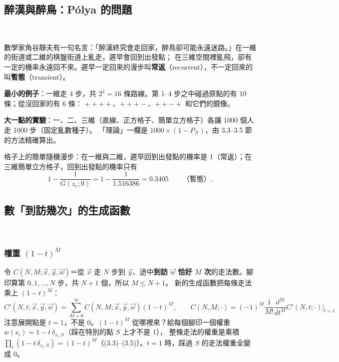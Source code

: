 \subsection{醉漢與醉鳥：Pólya 的問題}
\ 

數學家角谷靜夫有一句名言：「醉漢終究會走回家，醉鳥卻可能永遠迷路。」在一維的街道或二維的棋盤街道上亂走，遲早會回到出發點；
在三維空間裡亂飛，卻有一定的機率永遠回不來。遲早一定回來的漫步叫\textbf{常返}（recurrent），不一定回來的叫\textbf{暫態}（transient）。

\textbf{最小的例子}：一維走 4 步，共 $2^4=16$ 條路線。第 1--4 步之中碰過原點的有 10 條；從沒回家的有 6 條：
$++++$、$+++-$、$++-+$ 和它們的鏡像。

\textbf{大一點的實驗}：一、二、三維（直線、正方格子、簡單立方格子）各讓 1000 個人走 1000 步（固定亂數種子）。
「理論」一欄是 $1000\times(1-P_N)$，由 3.3--3.5 節的方法精確算出。
\begin{table}[H]
\centering
\small
\ThreeTabSim
\caption{各 1000 人的模擬：回過家的人數。一、二維的比例一直往 1 爬（二維爬得很慢），三維卡在三分之一左右}\label{three-tab-sim}
\end{table}

\begin{thmbox}[Pólya 定理]
格子上的簡單隨機漫步：在一維與二維，遲早回到出發點的機率是 1（常返）；在三維簡單立方格子，回到出發點的機率只有
\[1-\frac{1}{G(z_c;0)}=1-\frac{1}{1.516386}=0.3405\qquad\text{（暫態）}.\]
\end{thmbox}

\subsection{數「到訪幾次」的生成函數}
\ 

\subsubsection{權重 \texorpdfstring{$(1-t)^M$}{(1-t) 的 M 次方}}
令 $C(N,M;\vec x,\vec y,\vec w)$＝從 $\vec x$ 走 $N$ 步到 $\vec y$、途中\textbf{到訪 $\vec w$ 恰好 $M$ 次}的走法數。腳印算第 $0,1,\dots,N$ 步，共 $N+1$ 個，所以 $M\le N+1$。
新的生成函數把每條走法乘上 $(1-t)^M$：
\[C'(N,t;\vec x,\vec y,\vec w)=\sum_{M=0}^{\infty}C(N,M;\vec x,\vec y,\vec w)(1-t)^M,\qquad
C(N,M;\cdot)=(-1)^M\frac{1}{M!}\frac{d^M}{dt^M}C'(N,t;\cdot)\Big|_{t=1}\tag{3.1, 3.2}\]
注意展開點是 $t=1$，不是 $0$。$(1-t)^M$ 從哪裡來？給每個腳印一個權重 $w(s_i)=1-t\,\delta_{s_i,S}$（踩在特別的點 $S$ 上才不是 1），
整條走法的權重是乘積 $\prod_i(1-t\,\delta_{s_i,S})=(1-t)^M$（(3.3)--(3.5)）。$t=1$ 時，踩過 $S$ 的走法權重全變成 0。

